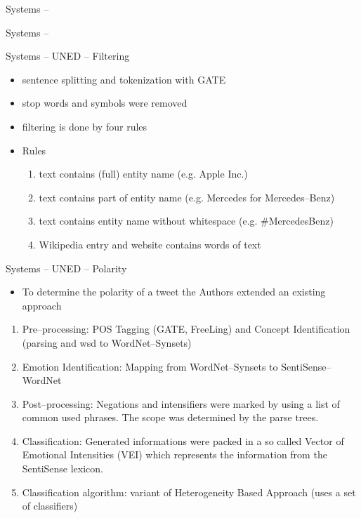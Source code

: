 \documentclass[12pt,a4paper]{beamer}
\begin{document}
\begin{frame}{Systems -- }

\end{frame}


\begin{frame}{Systems -- }

\end{frame}

\begin{frame}{Systems -- UNED -- Filtering}

\begin{itemize}
\item sentence splitting and tokenization with GATE
\item stop words and symbols were removed
\item filtering is done by four rules
\end{itemize}
\begin{itemize}
\item Rules
\begin{enumerate}
\item text contains (full) entity name (e.g. Apple Inc.)
\item text contains part of entity name (e.g. Mercedes for Mercedes--Benz)
\item text contains entity name without whitespace (e.g. \#MercedesBenz)
\item Wikipedia entry and website contains words of text
\end{enumerate}
\end{itemize}
\end{frame}






\begin{frame}{Systems -- UNED -- Polarity}
\begin{itemize}
\item To determine the polarity of a tweet the Authors extended an existing approach
\end{itemize}
\begin{enumerate}
\item Pre--processing: POS Tagging (GATE, FreeLing) and Concept Identification (parsing and wsd to WordNet--Synsets)
\item Emotion Identification: Mapping from WordNet--Synsets to SentiSense--WordNet
\item Post--processing: Negations and intensifiers were marked by using a list of common used phrases. The scope was determined by the parse trees.
\item Classification: Generated informations were packed in a so called Vector of Emotional Intensities (VEI) which represents the information from the SentiSense lexicon.
\item Classification algorithm: variant of Heterogeneity Based Approach (uses a set of classifiers)
\end{enumerate}

\end{frame}
\end{document}
